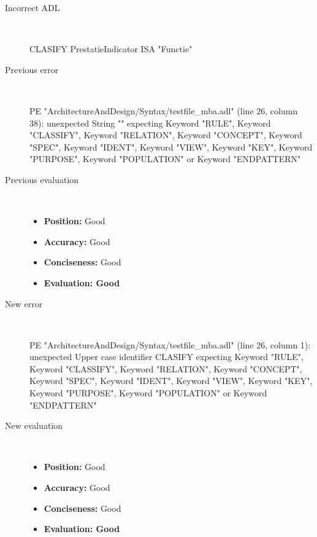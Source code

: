 \hrulefill

\begin{description}
  \item[Incorrect ADL]~\\
\begin{adl}
CLASIFY PrestatieIndicator ISA "Functie"\end{adl}
  \item[Previous error]~\\
\begin{haskell}
PE "ArchitectureAndDesign/Syntax/testfile_mba.adl" (line 26, column 38):
unexpected String ""
expecting Keyword "RULE", Keyword "CLASSIFY", Keyword "RELATION", Keyword "CONCEPT", Keyword "SPEC", Keyword "IDENT", Keyword "VIEW", Keyword "KEY", Keyword "PURPOSE", Keyword "POPULATION" or Keyword "ENDPATTERN"\end{haskell}
  \item[Previous evaluation]~\\
    \begin{itemize}
    \item \textbf{Position:} Good
    \item \textbf{Accuracy:} Good
    \item \textbf{Conciseness:} Good
    \item \textbf{Evaluation: Good}
    \end{itemize}
  \item[New error]~\\
\begin{haskell}
PE "ArchitectureAndDesign/Syntax/testfile_mba.adl" (line 26, column 1):
unexpected Upper case identifier CLASIFY
expecting Keyword "RULE", Keyword "CLASSIFY", Keyword "RELATION", Keyword "CONCEPT", Keyword "SPEC", Keyword "IDENT", Keyword "VIEW", Keyword "KEY", Keyword "PURPOSE", Keyword "POPULATION" or Keyword "ENDPATTERN"
\end{haskell}
  \item[New evaluation]~\\
    \begin{itemize}
    \item \textbf{Position:} Good
    \item \textbf{Accuracy:} Good
    \item \textbf{Conciseness:} Good
    \item \textbf{Evaluation: Good}
    \end{itemize}
  \end{description}

\hrulefill


